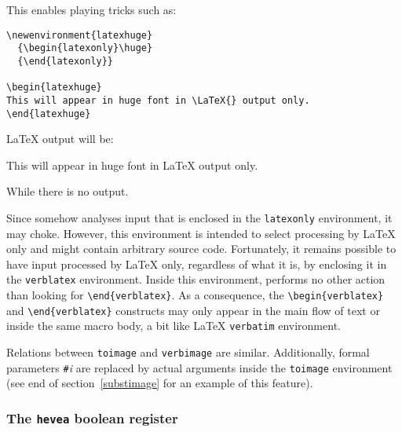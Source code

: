 This enables playing tricks such as:
\begin{verbatim}
\newenvironment{latexhuge}
  {\begin{latexonly}\huge}
  {\end{latexonly}}

\begin{latexhuge}
This will appear in huge font in \LaTeX{} output only.
\end{latexhuge}
\end{verbatim}
\LaTeX{} output will be:
\begin{latexout}
\begin{showlatex}
\newenvironment{latexhuge}
  {\begin{latexonly}\huge}
  {\end{latexonly}}
\begin{latexhuge}
This  will appear in huge font in \LaTeX{} output only.
\end{latexhuge}
\end{showlatex}
\end{latexout}
\noindent While there is no \hevea{} output.

Since \hevea{} somehow analyses input that is enclosed in the
\texttt{latexonly} environment,
it may choke.
However, this environment is intended to select processing by
\LaTeX{} only and might contain arbitrary source code.
Fortunately, it remains possible to have input processed by \LaTeX{}
only, regardless of what it is, by enclosing it in the
\texttt{verblatex} environment.
Inside this environment, \hevea{} performs no other action
than looking for \verb+\end{verblatex}+. As a consequence,
the \verb+\begin{verblatex}+ and \verb+\end{verblatex}+ constructs
may only appear in the main flow of text or inside the same macro body,
a bit like \LaTeX{} \texttt{verbatim} environment.


Relations between \texttt{toimage} and \texttt{verbimage} are similar.
Additionally, formal parameters \verb+#+\textit{i} are replaced by
actual arguments inside the \texttt{toimage} environment
(see end of section~\ref{substimage} for an example of this feature).

\subsubsection{The \texttt{hevea} boolean register}\label{heveabool}

